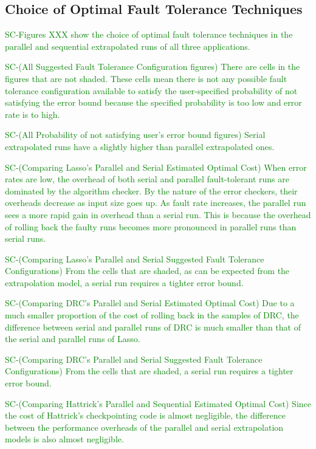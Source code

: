 \documentclass{sig-alternate}
\newcommand{\sui}[1]{%
  \textcolor{green}{SC-#1}
}
\begin{document}
\subsection{Choice of Optimal Fault Tolerance Techniques}
\label{sec:eval:optchoice}

\sui{Figures XXX show the choice of optimal fault tolerance techniques in the parallel and sequential extrapolated runs of all three applications.}

\sui{(All Suggested Fault Tolerance Configuration figures)
There are cells in the figures that are not shaded. These cells mean there is not any possible fault tolerance configuration available to satisfy the user-specified probability of not satisfying the error bound because the specified probability is too low and error rate is to high.}

\sui{(All Probability of not satisfying user's error bound figures) 
Serial extrapolated runs have a slightly higher than parallel extrapolated ones.}

\sui{(Comparing Lasso's Parallel and Serial Estimated Optimal Cost)
When error rates are low, the overhead of both serial and parallel fault-tolerant runs are dominated by the algorithm checker. By the nature of the error checkers, their overheads decrease as input size goes up.
As fault rate increases, the parallel run sees a more rapid gain in overhead than a serial run. This is because the overhead of rolling back the faulty runs becomes more pronounced in parallel runs than serial runs.}

\sui{(Comparing Lasso's Parallel and Serial Suggested Fault Tolerance Configurations)
From the cells that are shaded, as can be expected from the extrapolation model, a serial run requires a tighter error bound. }

\sui{(Comparing DRC's Parallel and Serial Estimated Optimal Cost)
Due to a much smaller proportion of the cost of rolling back in the samples of DRC, the difference between serial and parallel runs of DRC is much smaller than that of the serial and parallel runs of Lasso.}

\sui{(Comparing DRC's Parallel and Serial Suggested Fault Tolerance Configurations)
From the cells that are shaded, a serial run requires a tighter error bound.}

\sui{(Comparing Hattrick's Parallel and Sequential Estimated Optimal Cost)
Since the cost of Hattrick's checkpointing code is almost negligible, the difference between the performance overheads of the parallel and serial extrapolation models is also almost negligible.}
\end{document}
